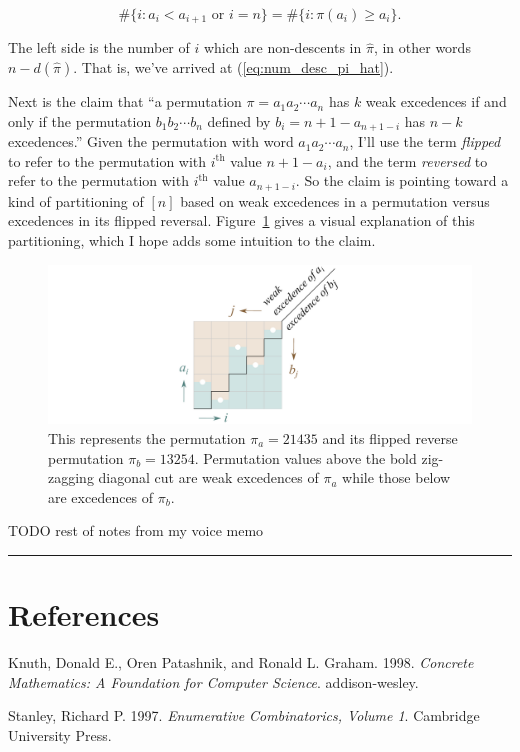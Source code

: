 \documentclass[]{article}
\begin{document}
\[\#\{i:a_i<a_{i+1}\text{ or }i=n\} = \#\{i:\pi(a_i)\ge a_i\}.\]

The left side is the number of \(i\) which are non-descents in
\(\hat\pi\), in other words \(n - d(\hat\pi)\). That is, we've arrived
at (\ref{eq:num_desc_pi_hat}).

Next is the claim that ``a permutation \(\pi=a_1a_2\cdots a_n\) has
\(k\) weak excedences if and only if the permutation
\(b_1b_2\cdots b_n\) defined by \(b_i = n+1-a_{n+1-i}\) has \(n-k\)
excedences.'' Given the permutation with word \(a_1a_2\cdots a_n\), I'll
use the term \emph{flipped} to refer to the permutation with
\(i^\text{th}\) value \(n+1-a_i\), and the term \emph{reversed} to refer
to the permutation with \(i^\text{th}\) value \(a_{n+1-i}\). So the
claim is pointing toward a kind of partitioning of \([n]\) based on weak
excedences in a permutation versus excedences in its flipped reversal.
Figure~\ref{fig:excedence} gives a visual explanation of this
partitioning, which I hope adds some intuition to the claim.

\begin{figure}[htbp]
\centering
\includegraphics{images/pdfs/excedence.pdf}
\caption{\label{fig:excedence}This represents the permutation
\(\pi_a = 21435\) and its flipped reverse permutation \(\pi_b = 13254\).
Permutation values above the bold zig-zagging diagonal cut are weak
excedences of \(\pi_a\) while those below are excedences of
\(\pi_b\).}\label{fig:excedence}
\end{figure}

TODO rest of notes from my voice memo

\begin{center}\rule{0.5\linewidth}{\linethickness}\end{center}

\section*{References}\label{references}

\hypertarget{refs}{}
\hypertarget{ref-concrete}{}
Knuth, Donald E., Oren Patashnik, and Ronald L. Graham. 1998.
\emph{Concrete Mathematics: A Foundation for Computer Science}.
addison-wesley.

\hypertarget{ref-stanley}{}
Stanley, Richard P. 1997. \emph{Enumerative Combinatorics, Volume 1}.
Cambridge University Press.
\end{document}
